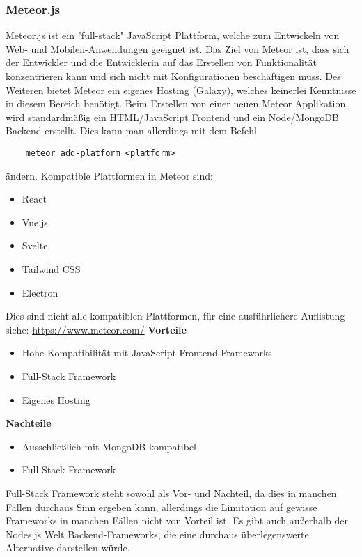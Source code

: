 \subsubsection{Meteor.js}
Meteor.js ist ein "full-stack" JavaScript Plattform, welche zum Entwickeln von Web- und Mobilen-Anwendungen geeignet ist. Das Ziel von Meteor ist, dass sich der Entwickler und die Entwicklerin auf das Erstellen von Funktionalität konzentrieren kann und sich nicht mit Konfigurationen beschäftigen muss. Des Weiteren bietet Meteor ein eigenes Hosting (Galaxy), welches keinerlei Kenntnisse in diesem Bereich benötigt. 
\newline
Beim Erstellen von einer neuen Meteor Applikation, wird standardmäßig ein HTML/JavaScript Frontend und ein Node/MongoDB Backend erstellt. Dies kann man allerdings mit dem Befehl
\begin{verbatim}
    meteor add-platform <platform>
\end{verbatim}
ändern. Kompatible Plattformen in Meteor sind:
\begin{itemize}
    \item React
    \item Vue.js
    \item Svelte
    \item Tailwind CSS
    \item Electron
\end{itemize}
Dies sind nicht alle kompatiblen Plattformen, für eine ausführlichere Auflistung siehe: \url{https://www.meteor.com/}
\newline
\textbf{Vorteile}
\begin{itemize}
    \item Hohe Kompatibilität mit JavaScript Frontend Frameworks
    \item Full-Stack Framework
    \item Eigenes Hosting
\end{itemize}
\textbf{Nachteile}
\begin{itemize}
    \item Ausschließlich mit MongoDB kompatibel
    \item Full-Stack Framework
\end{itemize}
Full-Stack Framework steht sowohl als Vor- und Nachteil, da dies in manchen Fällen durchaus Sinn ergeben kann, allerdings die Limitation auf gewisse Frameworks in manchen Fällen nicht von Vorteil ist.
\cite{backend_meteor}
\cite{backend_meteor_1}
\newpage
Es gibt auch außerhalb der Nodes.js Welt Backend-Frameworks, die eine durchaus überlegenswerte Alternative darstellen würde.

